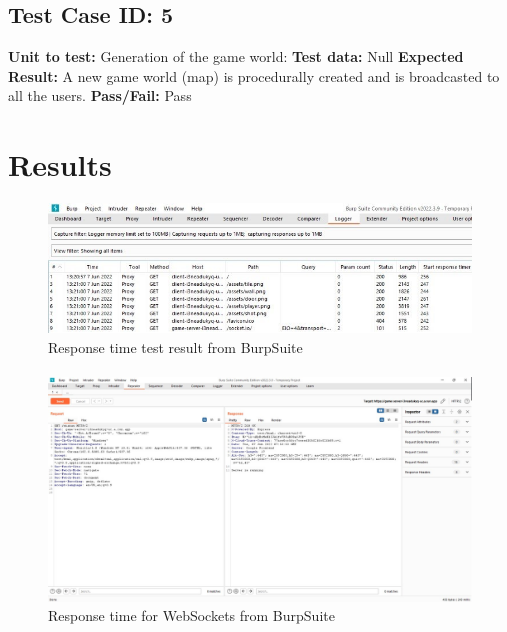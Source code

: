 \documentclass[oneside,12pt]{Classes/VTU}
\begin{document}
			\subsection{Test Case ID: 5}
				\textbf{Unit to test: }Generation of the game world: 
				\newline
				\textbf{Test data: }Null
				\newline
				\textbf{Expected Result: }A new game world (map) is procedurally created and is broadcasted to all the users.  
				\newline
				\textbf{Pass/Fail: }Pass
		
		\section{Results}
			\begin{figure}[ht!]
				\includegraphics[width=15cm]{op1.jpeg}
				\centering
				\caption{Response time test result from BurpSuite}
				\label{fig:op1}
			\end{figure}
		
			\paragraph{}
		
			\begin{figure}[ht!]
				\includegraphics[width=16cm]{op3.jpeg}
				\centering
				\caption{Response time for WebSockets from BurpSuite}
				\label{fig:op3}
			\end{figure}
		
\end{document}
